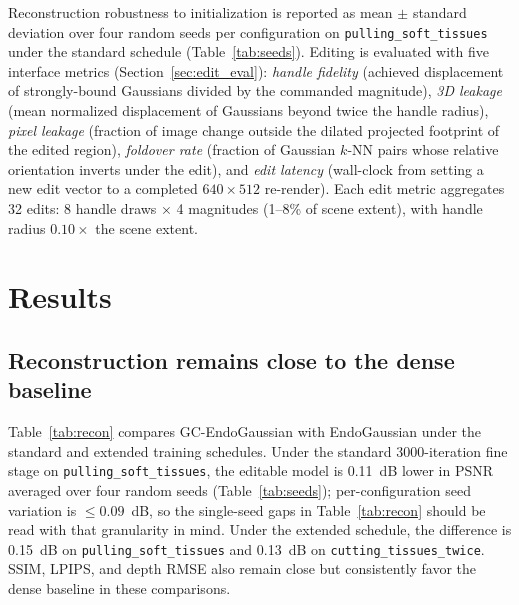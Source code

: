 \documentclass[AMA,Times1COL]{WileyNJDv5} %
\begin{document}
Reconstruction robustness to initialization is reported as mean $\pm$ standard deviation over four random seeds per configuration on \texttt{pulling\_soft\_tissues} under the standard schedule (Table~\ref{tab:seeds}). Editing is evaluated with five interface metrics (Section~\ref{sec:edit_eval}): \emph{handle fidelity} (achieved displacement of strongly-bound Gaussians divided by the commanded magnitude), \emph{3D leakage} (mean normalized displacement of Gaussians beyond twice the handle radius), \emph{pixel leakage} (fraction of image change outside the dilated projected footprint of the edited region), \emph{foldover rate} (fraction of Gaussian $k$-NN pairs whose relative orientation inverts under the edit), and \emph{edit latency} (wall-clock from setting a new edit vector to a completed $640\times512$ re-render). Each edit metric aggregates 32 edits: 8 handle draws $\times$ 4 magnitudes (1--8\% of scene extent), with handle radius $0.10\times$ the scene extent.

\section{Results}\label{sec5}

\subsection{Reconstruction remains close to the dense baseline}

Table~\ref{tab:recon} compares GC-EndoGaussian with EndoGaussian under the standard and extended training schedules. Under the standard 3000-iteration fine stage on \texttt{pulling\_soft\_tissues}, the editable model is 0.11~dB lower in PSNR averaged over four random seeds (Table~\ref{tab:seeds}); per-configuration seed variation is $\leq 0.09$~dB, so the single-seed gaps in Table~\ref{tab:recon} should be read with that granularity in mind. Under the extended schedule, the difference is 0.15~dB on \texttt{pulling\_soft\_tissues} and 0.13~dB on \texttt{cutting\_tissues\_twice}. SSIM, LPIPS, and depth RMSE also remain close but consistently favor the dense baseline in these comparisons.
\end{document}
